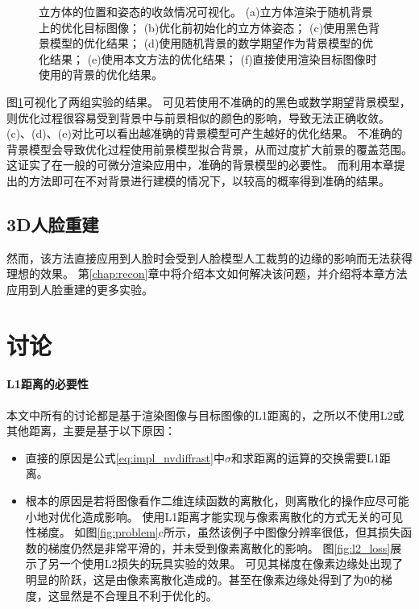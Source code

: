 \begin{figure}
    \caption[立方体的位置和姿态的收敛情况可视化]{
        立方体的位置和姿态的收敛情况可视化。
        (a)立方体渲染于随机背景上的优化目标图像；
        (b)优化前初始化的立方体姿态；
        (c)使用黑色背景模型的优化结果；
        (d)使用随机背景的数学期望作为背景模型的优化结果；
        (e)使用本文方法的优化结果；
        (f)直接使用渲染目标图像时使用的背景的优化结果。
    }
    \label{fig:cube_opt_vis}
\end{figure}
图\ref{fig:cube_opt_vis}可视化了两组实验的结果。
可见若使用不准确的的黑色或数学期望背景模型，则优化过程很容易受到背景中与前景相似的颜色的影响，导致无法正确收敛。
(c)、(d)、(e)对比可以看出越准确的背景模型可产生越好的优化结果。
不准确的背景模型会导致优化过程使用前景模型拟合背景，从而过度扩大前景的覆盖范围。
这证实了在一般的可微分渲染应用中，准确的背景模型的必要性。
而利用本章提出的方法即可在不对背景进行建模的情况下，以较高的概率得到准确的结果。

\subsection{3D人脸重建}


然而，该方法直接应用到人脸时会受到人脸模型人工裁剪的边缘的影响而无法获得理想的效果。
第\ref{chap:recon}章中将介绍本文如何解决该问题，并介绍将本章方法应用到人脸重建的更多实验。

\section{讨论}
\label{sec:method_discuss}

\paragraph{L1距离的必要性}
本文中所有的讨论都是基于渲染图像与目标图像的L1距离的，之所以不使用L2或其他距离，主要是基于以下原因：
\begin{itemize}
\item 直接的原因是公式\eqref{eq:impl_nvdiffrast}中$\sigma$和求距离的运算的交换需要L1距离。
\item 根本的原因是若将图像看作二维连续函数的离散化，则离散化的操作应尽可能小地对优化造成影响。
使用L1距离才能实现与像素离散化的方式无关的可见性梯度。
如图\ref{fig:problem}c所示，虽然该例子中图像分辨率很低，但其损失函数的梯度仍然是非常平滑的，并未受到像素离散化的影响。
图\ref{fig:l2_loss}展示了另一个使用L2损失的玩具实验的效果。
可见其梯度在像素边缘处出现了明显的阶跃，这是由像素离散化造成的。甚至在像素边缘处得到了为0的梯度，这显然是不合理且不利于优化的。
\end{itemize}

